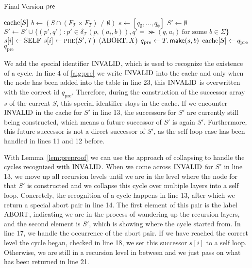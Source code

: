 \begin{algorithm}[ht]
\caption{Final Version $\operatorname{\textsf{pre}}$}\label{alg:pre}
\begin{algorithmic}[1]
\If{$\cache[S]$}
\Return $\cache[S]$
\EndIf
\color{blue!75}
\State {$\cache[S] \gets \invalid$} 
\color{black}
\State $b \gets (S \cap (F_{\mathcal{T}} \times F_{T} ) \neq \emptyset)$
\State $s \gets [q_{\emptyset},\dots,q_{\emptyset}]$
\State $S' \gets \emptyset$
\State $S' \gets S' \cup \{ (p',q'): p' \in \delta_{\mathcal{T}}(p,(a_{i},b)), q'=\Succ(q,a_{i}) \ \text{for some $b \in \Sigma$} \}$
\EndFor
{}
\State $s[i] \gets \mathrm{SELF}$
\color{blue!75}
\ElsIf {$\cache[S'] = \invalid$}
\color{black}
\Else
\State $s[i] \gets \Call{pre}{S',\mathcal{T}}$
\color{blue!75}
\Else
\Return $(\mathrm{ABORT}, X)$
\color{black}
\EndIf 
\EndIf
\EndIf
\EndFor
\State $q_{\text{pre}} \gets T.\operatorname{\textsf{make}}(s,b)$
\State $\mathrm{cache}[S] \gets q_{\text{pre}}$
\Return $q_{\text{pre}} $
\EndProcedure
\end{algorithmic}
\end{algorithm}



We add the special identifier $\invalid$, which is used to recognize the existence of a cycle. In line 4 of \autoref{alg:pre} we write $\invalid$ into the cache and only when the node has been added into the table in line 23, this $\invalid$ is overwritten with the correct id $q_{\text{pre}}$. Therefore, during the construction of the successor array $s$ of the current $S$, this special identifier stays in the cache. If we encounter $\invalid$ in the cache for $S'$ in line 13, the successors for $S'$ are currently still being constructed, which means a future successor of $S'$ is again $S'$. Furthermore, this future successor is not a direct successor of $S'$, as the self loop case has been handled in lines 11 and 12 before.

\par

With Lemma~\autoref{lem:preproof} we can use the approach of collapsing to handle the cycles recognized with $\invalid$. When we come across $\invalid$ for $S'$ in line 13, we move up all recursion levels until we are in the level where the node for that $S'$ is constructed and we collapse this cycle over multiple layers into a self loop. 
Concretely, the recognition of a cycle happens in line 13, after which we return a special abort pair in line 14. 
The first element of this pair is the label $\mathrm{ABORT}$, indicating we are in the process of wandering up the recursion layers, and the second element is $S'$, which is showing where the cycle started from. 
In line 17, we handle the occurrence of the abort pair. If we have reached the correct level the cycle began, checked in line 18, we set this successor $s[i]$ to a self loop. Otherwise, we are still in a recursion level in between and we just pass on what has been returned in line 21.


